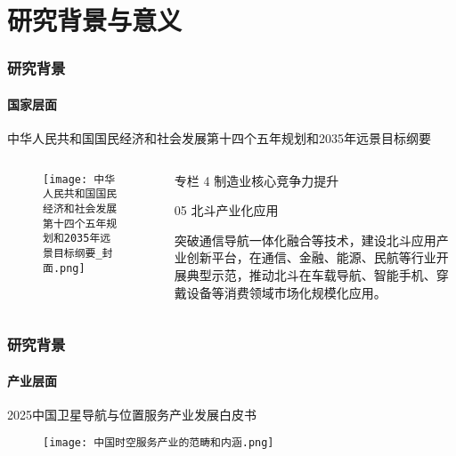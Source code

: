 

\section{研究背景与意义}

\begin{frame}
	\frametitle{研究背景} 
	\framesubtitle{国家层面}
	中华人民共和国国民经济和社会发展第十四个五年规划和2035年远景目标纲要
	\begin{columns}
		\begin{column}{0.4\textwidth}
		    \vspace{-0.4cm}
		   	\begin{figure}
    			\texttt{[image: 中华人民共和国国民经济和社会发展第十四个五年规划和2035年远景目标纲要\_封面.png]}
		   	\end{figure}
		\end{column}   
		\begin{column}{0.6\textwidth}
			专栏 4 制造业核心竞争力提升
		   	
		   	05 北斗产业化应用
		   	
		   	突破通信导航一体化融合等技术，建设北斗应用产业创新平台，在通信、金融、能源、民航等行业开展典型示范，推动北斗在车载导航、智能手机、穿戴设备等消费领域市场化规模化应用。 
		\end{column}
	\end{columns}   	
\end{frame}

\begin{frame}
	\frametitle{研究背景} 
	\framesubtitle{产业层面}
	\vspace{-0.2cm}
	2025中国卫星导航与位置服务产业发展白皮书
   	\begin{figure}
   	\centering
   	    \texttt{[image: 中国时空服务产业的范畴和内涵.png]}
   	\end{figure} 
\end{frame}
